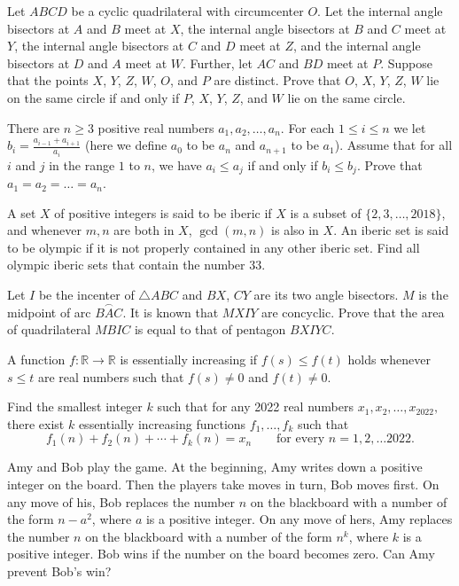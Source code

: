 \documentclass[11pt]{scrartcl}
\begin{document}
\begin{problem}[653910026918142375]
Let $ABCD$ be a cyclic quadrilateral with circumcenter $O$. Let the internal angle bisectors at $A$ and $B$ meet at $X$, the internal angle bisectors at $B$ and $C$ meet at $Y$, the internal angle bisectors at $C$ and $D$ meet at $Z$, and the internal angle bisectors at $D$ and $A$ meet at $W$. Further, let $AC$ and $BD$ meet at $P$. Suppose that the points $X$, $Y$, $Z$, $W$, $O$, and $P$ are distinct.
Prove that $O$, $X$, $Y$, $Z$, $W$ lie on the same circle if and only if $P$, $X$, $Y$, $Z$, and $W$ lie on the same circle.
\end{problem}
\begin{problem}[7003931234708262274]
There are $n \ge 3$ positive real numbers $a_1, a_2, \dots, a_n$. For each $1 \le i \le n$ we let $b_i = \frac{a_{i-1} + a_{i+1}}{a_i}$ (here we define $a_0$ to be $a_n$ and $a_{n+1}$ to be $a_1$). Assume that for all $i$ and $j$ in the range $1$ to $n$, we have $a_i \le a_j$ if and only if $b_i \le b_j$.
Prove that $a_1 = a_2 = \dots = a_n$.
\end{problem}
\begin{problem}[3214097809181137769]
	A set $X$ of positive integers is said to be iberic if $X$ is a subset of $\{2, 3, \dots, 2018\}$, and whenever $m, n$ are both in $X$, $\gcd(m, n)$ is also in $X$. An iberic set is said to be olympic if it is not properly contained in any other iberic set. Find all olympic iberic sets that contain the number $33$.
\end{problem}
\begin{problem}[120014342762916]
Let ${I}$ be the incenter of $\triangle {ABC}$ and ${BX}$, ${CY}$ are its two angle bisectors. ${M}$ is the midpoint of arc $\overset{\frown}{BAC}$. It is known that $MXIY$ are concyclic. Prove that the area of quadrilateral $MBIC$ is equal to that of pentagon $BXIYC$.
\end{problem}
\begin{problem}[8892145789808454835]
A function $f: \mathbb{R}\to \mathbb{R}$ is essentially increasing if $f(s)\leq f(t)$ holds whenever $s\leq t$ are real numbers such that $f(s)\neq 0$ and $f(t)\neq 0$.

Find the smallest integer $k$ such that for any 2022 real numbers $x_1,x_2,\ldots , x_{2022},$ there exist $k$ essentially increasing functions $f_1,\ldots, f_k$ such that\[f_1(n) + f_2(n) + \cdots + f_k(n) = x_n\qquad \text{for every } n= 1,2,\ldots 2022.\]
\end{problem}
\begin{problem}[613633329435671]
Amy and Bob play the game. At the beginning, Amy writes down a positive integer on the board. Then the players take moves in turn, Bob moves first. On any move of his, Bob replaces the number $n$ on the blackboard with a number of the form $n-a^2$, where $a$ is a positive integer. On any move of hers, Amy replaces the number $n$ on the blackboard with a number of the form $n^k$, where $k$ is a positive integer. Bob wins if the number on the board becomes zero.
Can Amy prevent Bob’s win?
\end{problem}
\end{document}
